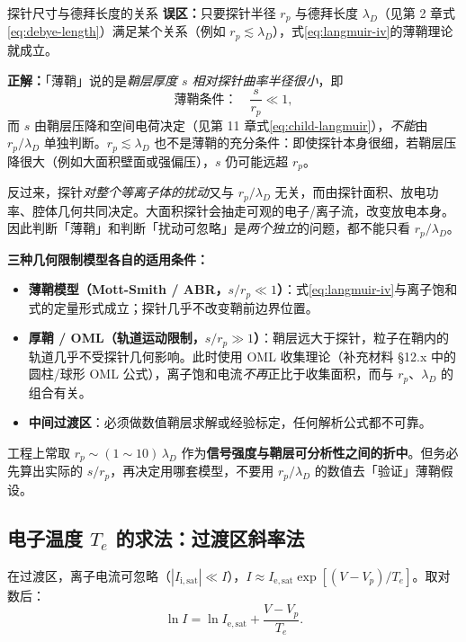 \documentclass[12pt,a4paper,openany,oneside]{book}
\begin{document}
\begin{warning}{探针尺寸与德拜长度的关系}{}
\textbf{误区：}只要探针半径 $r_p$ 与德拜长度 $\lambda_D$（见第 2 章式\eqref{eq:debye-length}）满足某个关系（例如 $r_p\lesssim\lambda_D$），式\eqref{eq:langmuir-iv}的薄鞘理论就成立。

\textbf{正解：}「薄鞘」说的是\emph{鞘层厚度 $s$ 相对探针曲率半径很小}，即
\begin{equation}
\text{薄鞘条件：}\quad \frac{s}{r_p}\ll 1 ,
\label{eq:thin-sheath}
\end{equation}
而 $s$ 由鞘层压降和空间电荷决定（见第 11 章式\eqref{eq:child-langmuir}），\emph{不能}由 $r_p/\lambda_D$ 单独判断。$r_p\lesssim\lambda_D$ 也不是薄鞘的充分条件：即使探针本身很细，若鞘层压降很大（例如大面积壁面或强偏压），$s$ 仍可能远超 $r_p$。

反过来，探针\emph{对整个等离子体的扰动}又与 $r_p/\lambda_D$ 无关，而由探针面积、放电功率、腔体几何共同决定。大面积探针会抽走可观的电子/离子流，改变放电本身。因此判断「薄鞘」和判断「扰动可忽略」是\emph{两个独立}的问题，都不能只看 $r_p/\lambda_D$。

\textbf{三种几何限制模型各自的适用条件：}
\begin{itemize}
    \item \textbf{薄鞘模型（Mott-Smith / ABR，$s/r_p\ll1$）}：式\eqref{eq:langmuir-iv}与离子饱和式的定量形式成立；探针几乎不改变鞘前边界位置。
    \item \textbf{厚鞘 / OML（轨道运动限制，$s/r_p\gg1$）}：鞘层远大于探针，粒子在鞘内的轨道几乎不受探针几何影响。此时使用 OML 收集理论（补充材料 \S 12.x 中的圆柱/球形 OML 公式），离子饱和电流\emph{不再}正比于收集面积，而与 $r_p$、$\lambda_D$ 的组合有关。
    \item \textbf{中间过渡区}：必须做数值鞘层求解或经验标定，任何解析公式都不可靠。
\end{itemize}
工程上常取 $r_p\sim(1\sim10)\,\lambda_D$ 作为\textbf{信号强度与鞘层可分析性之间的折中}。但务必先算出实际的 $s/r_p$，再决定用哪套模型，不要用 $r_p/\lambda_D$ 的数值去「验证」薄鞘假设。
\end{warning}

\subsection{电子温度 \texorpdfstring{$T_e$}{Te} 的求法：过渡区斜率法}

在过渡区，离子电流可忽略（$|I_{\mathrm{i,sat}}| \ll I$），$I \approx I_{\mathrm{e,sat}}\exp[(V - V_p)/T_e]$。取对数后：
\begin{equation}
\ln I = \ln I_{\mathrm{e,sat}} + \frac{V - V_p}{T_e}.
\label{eq:ch12-probe-current}
\end{equation}
\end{document}
